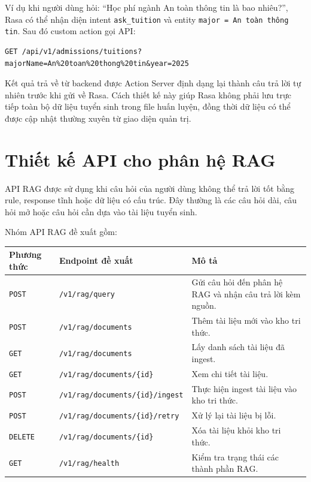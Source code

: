 Ví dụ khi người dùng hỏi: ``Học phí ngành An toàn thông tin là bao nhiêu?'', Rasa có thể nhận diện intent \texttt{ask\_tuition} và entity \texttt{major = An toàn thông tin}. Sau đó custom action gọi API:

\begin{verbatim}
GET /api/v1/admissions/tuitions?majorName=An%20toan%20thong%20tin&year=2025
\end{verbatim}

Kết quả trả về từ backend được Action Server định dạng lại thành câu trả lời tự nhiên trước khi gửi về Rasa. Cách thiết kế này giúp Rasa không phải lưu trực tiếp toàn bộ dữ liệu tuyển sinh trong file huấn luyện, đồng thời dữ liệu có thể được cập nhật thường xuyên từ giao diện quản trị.

\section{Thiết kế API cho phân hệ RAG}

API RAG được sử dụng khi câu hỏi của người dùng không thể trả lời tốt bằng rule, response tĩnh hoặc dữ liệu có cấu trúc. Đây thường là các câu hỏi dài, câu hỏi mở hoặc câu hỏi cần dựa vào tài liệu tuyển sinh.

Nhóm API RAG đề xuất gồm:

\begin{longtable}{|p{3cm}|p{5cm}|p{7cm}|}
\hline
\textbf{Phương thức} & \textbf{Endpoint đề xuất} & \textbf{Mô tả} \\
\hline
\texttt{POST} & \texttt{/v1/rag/query} & Gửi câu hỏi đến phân hệ RAG và nhận câu trả lời kèm nguồn. \\
\hline
\texttt{POST} & \texttt{/v1/rag/documents} & Thêm tài liệu mới vào kho tri thức. \\
\hline
\texttt{GET} & \texttt{/v1/rag/documents} & Lấy danh sách tài liệu đã ingest. \\
\hline
\texttt{GET} & \texttt{/v1/rag/documents/\{id\}} & Xem chi tiết tài liệu. \\
\hline
\texttt{POST} & \texttt{/v1/rag/documents/\{id\}/ingest} & Thực hiện ingest tài liệu vào kho tri thức. \\
\hline
\texttt{POST} & \texttt{/v1/rag/documents/\{id\}/retry} & Xử lý lại tài liệu bị lỗi. \\
\hline
\texttt{DELETE} & \texttt{/v1/rag/documents/\{id\}} & Xóa tài liệu khỏi kho tri thức. \\
\hline
\texttt{GET} & \texttt{/v1/rag/health} & Kiểm tra trạng thái các thành phần RAG. \\
\hline
\end{longtable}

